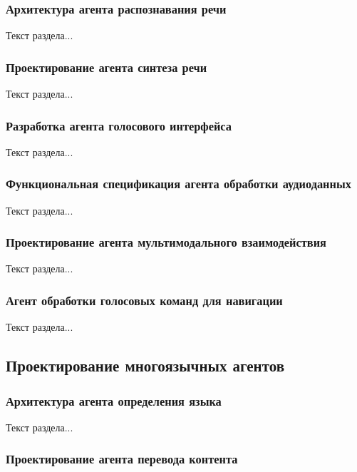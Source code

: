 \subsubsection{Архитектура агента распознавания речи}

Текст раздела...

\subsubsection{Проектирование агента синтеза речи}

Текст раздела...

\subsubsection{Разработка агента голосового интерфейса}

Текст раздела...

\subsubsection{Функциональная спецификация агента обработки аудиоданных}

Текст раздела...

\subsubsection{Проектирование агента мультимодального взаимодействия}

Текст раздела...

\subsubsection{Агент обработки голосовых команд для навигации}

Текст раздела...

\subsection{Проектирование многоязычных агентов}

\subsubsection{Архитектура агента определения языка}

Текст раздела...

\subsubsection{Проектирование агента перевода контента}

